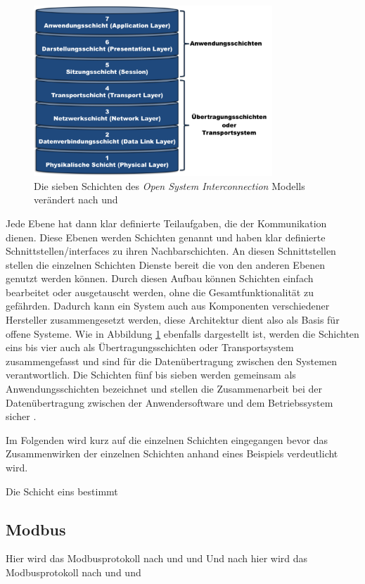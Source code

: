 \begin{figure}
\centering
\includegraphics[width=0.8\textwidth]{abbildungen/20160112_osi}
\caption[Die sieben Schichten des Open System Interconnection Modells]{Die sieben Schichten des \textit{Open System Interconnection} Modells verändert nach \cite[S.~10]{schn06} und \cite[S.~28]{osi96}}
\label{fig:osi}
\end{figure}

Jede Ebene hat dann klar definierte Teilaufgaben, die der Kommunikation dienen. Diese Ebenen werden Schichten genannt und haben klar definierte Schnittstellen/interfaces zu ihren Nachbarschichten. An diesen Schnittstellen stellen die einzelnen Schichten Dienste bereit die von den anderen Ebenen genutzt werden können. Durch diesen Aufbau können Schichten einfach bearbeitet oder ausgetauscht werden, ohne die Gesamtfunktionalität zu gefährden. Dadurch kann ein System auch aus Komponenten verschiedener Hersteller zusammengesetzt werden, diese Architektur dient also als Basis für offene Systeme. Wie in Abbildung \ref{fig:osi} ebenfalls dargestellt ist, werden die Schichten eins bis vier auch als Übertragungsschichten oder Transportsystem zusammengefasst und sind für die Datenübertragung zwischen den Systemen verantwortlich. Die Schichten fünf bis sieben werden gemeinsam als Anwendungsschichten bezeichnet und stellen die Zusammenarbeit bei der Datenübertragung zwischen der Anwendersoftware und dem Betriebssystem sicher \cite[S.~8f.]{schn06}.

Im Folgenden wird kurz auf die einzelnen Schichten eingegangen bevor das Zusammenwirken der einzelnen Schichten anhand eines Beispiels verdeutlicht wird.

Die Schicht eins bestimmt 


\subsection{Modbus}
Hier wird das Modbusprotokoll nach \cite{mod12} und \cite{mod06ser} und \cite{mod06tcp}  
Und nach hier wird das Modbusprotokoll nach \cite[S.5]{mod12} und \cite[S.5]{mod06ser} und \cite[S.5]{mod06tcp}


